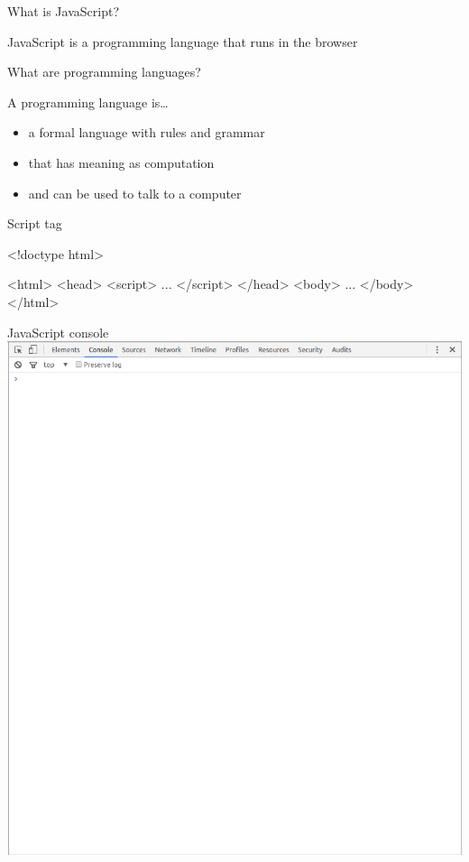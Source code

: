 \documentclass{beamer}
\begin{document}
\begin{frame}{What is JavaScript?}
  \begin{block}{}
      JavaScript is a programming language \pause that runs in the browser
  \end{block}
\end{frame}

\begin{frame}{What are programming languages?}
  \begin{block}{A programming language is\ldots{}}
    \begin{itemize}
    \item a formal language with rules and grammar \pause
    \item that has meaning as computation \pause
    \item and can be used to talk to a computer
    \end{itemize}
  \end{block}
\end{frame}

\begin{frame}[fragile]{Script tag}
 \begin{block}{}
\begin{semiverbatim}
<!doctype html>

<html>
  <head>
    <script>
      ...
    </script>
  </head>
  <body>
    ...
  </body>
</html>
\end{semiverbatim}
\end{block}
\end{frame}

\begin{frame}{JavaScript console}
\includegraphics[width=.9\linewidth]{console.png}
\end{frame}
\end{document}
